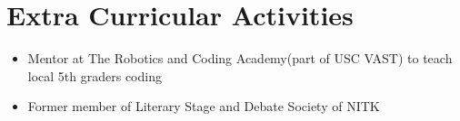 \newcommand\textlcsc[1]{\textsc{\MakeTextLowercase{#1}}}
\section{Extra Curricular Activities}
\begin{itemize}
\item Mentor at The Robotics and Coding Academy(part of USC VAST) to teach local 5th graders coding
\item Former member of Literary Stage and Debate Society of NITK
\end{itemize}
